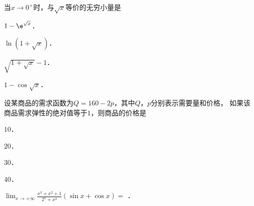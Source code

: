 \documentclass[plain,noanswer,medmath]{../../template/jnuexam}
\begin{document}






\begin{problem}
当$x \to 0^+$时，与$\sqrt{x}$等价的无穷小量是\pickout{}
\begin{abcd}
\item $1 - \e^{\sqrt{x}}$．
\item $\ln (1 + \sqrt{x})$．
\item $\sqrt{1^{} + \sqrt{x}} - 1$．
\item $1 - \cos \sqrt{x}$．
\end{abcd}
\end{problem}








\begin{problem}
设某商品的需求函数为$Q = 160 - 2p$，其中$Q$，$p$分别表示需要量和价格，
如果该商品需求弹性的绝对值等于$1$，则商品的价格是\pickout{}
\begin{abcd}
\item $10$．
\item $20$．
\item $30$．
\item $40$．
\end{abcd}
\end{problem}














\begin{problem}
$\lim_{x \to +\infty} \frac{x^3 + x^2 + 1}{2^x + x^3}(\sin x + \cos x) =$ \fillin{}．
\end{problem}




\end{document}

